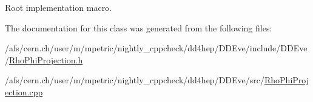 Root implementation macro. 



The documentation for this class was generated from the following files\+:\begin{DoxyCompactItemize}
\item 
/afs/cern.\+ch/user/m/mpetric/nightly\+\_\+cppcheck/dd4hep/\+D\+D\+Eve/include/\+D\+D\+Eve/\hyperlink{_rho_phi_projection_8h}{Rho\+Phi\+Projection.\+h}\item 
/afs/cern.\+ch/user/m/mpetric/nightly\+\_\+cppcheck/dd4hep/\+D\+D\+Eve/src/\hyperlink{_rho_phi_projection_8cpp}{Rho\+Phi\+Projection.\+cpp}\end{DoxyCompactItemize}
